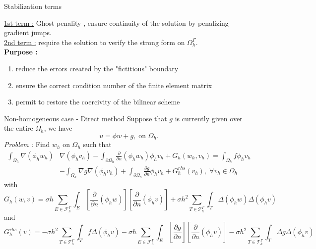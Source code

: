 \documentclass[compress,10pt,xcolor={table,dvipsnames},t]{beamer}
\begin{document}
	\begin{frame}{Stabilization terms}
		\begin{center}
			\centering
		\end{center}
		\small
		\underline{1st term :} Ghost penality \cite{burman_ghost_2010}, ensure continuity of the solution by penalizing gradient jumps. \\
		\underline{2nd term :} require the solution to verify the strong form on $\Omega_h^\Gamma$. \\
		\normalsize
		\textbf{Purpose :} 
		\begin{enumerate}[\ding{217}]
			\item reduce the errors created by the "fictitious" boundary 
			\item ensure the correct condition number of the finite element matrix
			\item permit to restore the coercivity of the bilinear scheme
		\end{enumerate}
	\end{frame}

	\begin{frame}{Non-homogeneous case - Direct method}
		\small
		Suppose that $g$ is currently given over the entire $\Omega_h$, we have
		\begin{equation*}
			u=\phi w +g, \; \text{on } \Omega_h.
		\end{equation*}
		\textit{Problem :} Find $w_h$ on $\Omega_h$ such that
		\begin{align*}
			\int_{\Omega_h}\nabla(\phi_h w_h)&\nabla(\phi_h v_h)-\int_{\partial\Omega_h}\frac{\partial}{\partial n}(\phi_h w_h)\phi_h v_h+G_h(w_h,v_h)=\int_{\Omega_h}f\phi_h v_h \\
			&-\int_{\Omega_h}\nabla g\nabla(\phi_h v_h)+\int_{\partial\Omega_h}\frac{\partial g}{\partial n}\phi_h v_h+G_h^{rhs}(v_h), \; \forall v_h\in \Omega_h
		\end{align*}
		with
		\begin{equation*}
			G_h(w,v)=\sigma h\sum_{E\in\mathcal{F}_h^\Gamma}\int_E\left[\frac{\partial}{\partial n}(\phi_h w)\right]\left[\frac{\partial}{\partial n}(\phi_h v)\right]+\sigma h^2\sum_{T\in\mathcal{T}_h^\Gamma}\int_T \Delta(\phi_h w)\Delta(\phi_h v)
		\end{equation*}
		and
		\begin{equation*}
			G_h^{rhs}(v)=-\sigma h^2\sum_{T\in\mathcal{T}_h^\Gamma}\int_T f\Delta(\phi_h v)-\sigma h\sum_{E\in\mathcal{F}_h^\Gamma}\int_E\left[\frac{\partial g}{\partial n}\right]\left[\frac{\partial}{\partial n}(\phi_h v)\right]-\sigma h^2\sum_{T\in\mathcal{T}_h^\Gamma}\int_T \Delta g\Delta(\phi_h v)
		\end{equation*}
	\end{frame}
			
\end{document}
